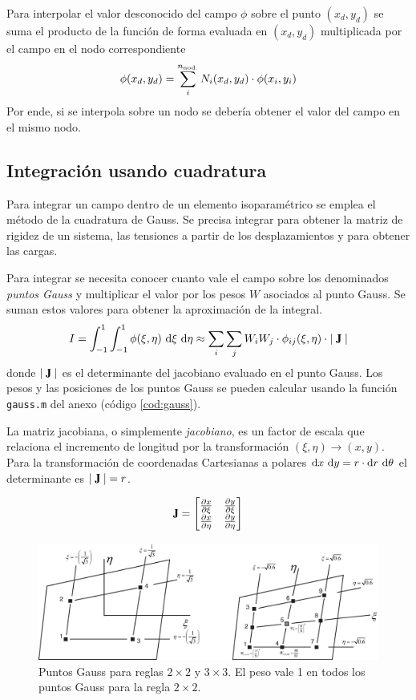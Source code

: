 Para interpolar el valor desconocido del campo $\phi$ sobre el punto $(x_d,y_d)$ se suma el producto de la función de forma evaluada en $(x_d,y_d)$ multiplicada por el campo en el nodo correspondiente
\[
\phi(x_d,y_d) = \sum_i^{n_{\mathrm{nod.}}} N_i(x_d,y_d) \cdot \phi(x_i,y_i) 
\]
Por ende, si se interpola sobre un nodo se debería obtener el valor del campo en el mismo nodo.


\subsection*{Integración usando cuadratura}
Para integrar un campo dentro de un elemento isoparamétrico se emplea el método de la cuadratura de Gauss. Se precisa integrar para obtener la matriz de rigidez de un sistema, las tensiones a partir de los desplazamientos y para obtener las cargas.

Para integrar se necesita conocer cuanto vale el campo sobre los denominados \textit{puntos Gauss} y multiplicar el valor por los pesos $W$ asociados al punto Gauss. Se suman estos valores para obtener la aproximación de la integral.
\begin{equation}
I=\int^1_{-1} \int^1_{-1}\phi(\xi,\eta)~ \di \xi~ \di \eta\approx \sum_i \sum_j W_i W_j \cdot \phi_{ij}(\xi,\eta) \cdot \Djac
\end{equation}
donde $\Djac$ es el determinante del jacobiano evaluado en el punto Gauss. Los pesos y las posiciones de los puntos Gauss se pueden calcular usando la función \texttt{gauss.m} del anexo (código \ref{cod:gauss}).

La matriz jacobiana, o simplemente \textit{jacobiano}, es un factor de escala que relaciona el incremento de longitud por la transformación $(\xi,\eta)\rightarrow(x,y)$. Para la transformación de coordenadas Cartesianas a polares $\textrm{d} x~ \textrm{d} y = r \cdot \textrm{d} r~  \textrm{d} \theta$ el determinante es $\Djac=r$.

\[
\jac = \begin{bmatrix}
\spartial{x}{\xi} & \spartial{y}{\xi} \\
\spartial{x}{\eta} & \spartial{y}{\eta}
\end{bmatrix}
\]

\begin{figure}[htb!]
	\centering
	\includegraphics[width=12cm]{fig/gauss_n3.eps}
	\caption{Puntos Gauss para reglas $2\times 2$ y $3\times3$. El peso vale 1 en todos los puntos Gauss para la regla $2\times2$.}
	\label{fig:gauss_n3}
\end{figure}

